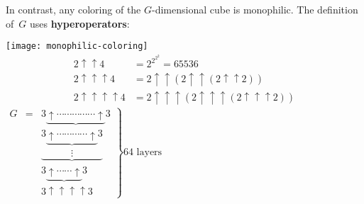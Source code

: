 \documentclass{zirkelblatt-single}
\begin{document}
\begin{center}
\begin{minipage}[t][4cm][t]{7.6cm}
  \color{white}
  In contrast, any coloring of the $G$-dimensional cube is monophilic.
  The definition of~$G$ uses \textbf{hyperoperators}:


  \begin{center}
  \begin{multicols*}{2}
  \quad\qquad\texttt{[image: monophilic-coloring]}
  \vspace*{-1em}
  \tiny
  \begin{align*}
    2 \uparrow\uparrow 4 &= 2^{2^{2^2}} = 65536 \\
    2 \uparrow\uparrow\uparrow 4 &= 2 \uparrow\uparrow (2 \uparrow\uparrow (2 \uparrow\uparrow 2)) \\
    2 \uparrow\uparrow\uparrow\uparrow 4 &= 2 \uparrow\uparrow\uparrow (2
    \uparrow\uparrow\uparrow (2 \uparrow\uparrow\uparrow 2))
  \end{align*}
  \columnbreak
  \quad$\left.\!\!\!\!\!\!\!\!\!\!\!\!\!\!\!\!\!\!\!\!\!\!\!
     \begin{matrix}
      G\!\!\!\!\! &=\!\!\!\!\!&3\underbrace{\uparrow \cdots \cdots \cdots \cdots \cdots \uparrow}3 \\
        & &3\underbrace{\uparrow \cdots \cdots \cdots \cdots \uparrow}3 \\[-0.4em]
        & & \underbrace{\qquad \quad \vdots \qquad \quad} \\
        & &3\underbrace{\uparrow \cdots \cdots \uparrow}3 \\
        & &3\uparrow \uparrow \uparrow \uparrow3
     \end{matrix}
    \right \} \text{64 layers}
    $
  \end{multicols*}
  \end{center}
\end{minipage}
\end{center}
\end{document}
